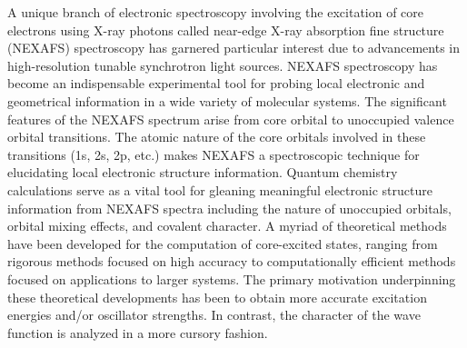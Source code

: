 \documentclass{article}
\begin{document}
A unique branch of electronic spectroscopy involving the excitation of core electrons using X-ray photons called near-edge X-ray absorption fine structure (NEXAFS) spectroscopy has garnered particular interest due to advancements in high-resolution tunable synchrotron light sources. NEXAFS spectroscopy has become an indispensable experimental tool for probing local electronic and geometrical information in a wide variety of molecular systems. \cite{westre_multiplet_1997,loble_covalency_2015-1,idrees_oxidation_2014,nelson_introduction_2012-1} The significant features of the NEXAFS spectrum arise from core orbital to unoccupied valence orbital transitions. \cite{stohr_nexafs_1992-1} The atomic nature of the core orbitals involved in these transitions (1s, 2s, 2p, etc.) makes NEXAFS a spectroscopic technique for elucidating local electronic structure information. Quantum chemistry calculations serve as a vital tool for gleaning meaningful electronic structure information from NEXAFS spectra including the nature of unoccupied orbitals, orbital mixing effects, and covalent character.\cite{stohr_nexafs_1992-1,loble_covalency_2015-1,nelson_introduction_2012,milne_recent_2014-1,cabaret_first-principles_2010-1}
A myriad of theoretical methods have been developed for the computation of core-excited states, ranging from rigorous methods focused on high accuracy \cite{coriani_coupled-cluster_2012,nooijen_description_1995,besley_equation_2012,peng_energy-specific_2015-1,dutta_intermediate_2014-1,brabec_communication:_2012,sen_study_2013-1,schirmer_beyond_1982-2,salpeter_relativistic_1951-1,barth_theoretical_1980,butscher_all-electron_1977-1,roemelt_excited_2013,asmuruf_calculation_2008,grimme_density_1996,lopata_linear-response_2012-2,fernando_x-ray_2015}
to computationally efficient methods focused on applications to larger systems.\cite{rehr_theoretical_2000,natoli_multiple_2012-1,joly_x-ray_2001,lowdin_statistical_1972,stener_time_2003-1,besley_time-dependent_2010-2,lestrange_calibration_2015,kuramoto_theoretical_2005,ohtsuka_inner-shell_2006,kolczewski_detailed_2001-1} The primary motivation underpinning these theoretical developments has been to obtain more accurate excitation energies and/or oscillator strengths. In contrast, the character of the wave function is analyzed in a more cursory fashion.
\end{document}

